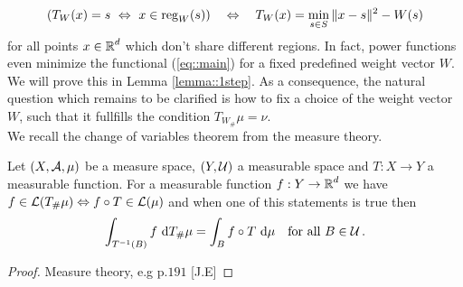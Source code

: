 \documentclass[
     12pt,         %
     a4paper,      %
     BCOR=10mm,     %
     DIV=14,        %
     ]{scrreprt}
\begin{document}
    \begin{align}
        ( T_W(x) = s \  \Leftrightarrow \ x\in \operatorname{reg}_W(s) ) \quad \Leftrightarrow \quad T_W(x) = \min_{s\in S} \|x-s\|^2 - W(s) \label{eq::minimalityPower}
    \end{align}
    for all points $x \in \operatorname{\mathbb{R}}^d$ which don't share different regions. In fact, power functions even minimize the functional (\ref{eq::main}) for a fixed predefined weight vector $W$.
    We will prove this in Lemma \ref{lemma::1step}. As a consequence, the natural question which remains to be clarified is how to fix a choice of the weight vector $W$, such that it fullfills the condition $T_{W_{\#}}\mu = \nu$.\\[8pt]
    \indent We recall the change of variables theorem from the measure theory. 
    \begin{thm*}
         Let $(X, \operatorname{\mathcal{A}}, \mu)$ be a measure space, $(Y, \operatorname{\mathcal{U}})$ a measurable space and $T: X \to Y $ a measurable function.
         For a measurable function $f : Y \to \operatorname{\mathbb{R}}^d $ we have $f\in \operatorname{\mathcal{L}}(T_\#\mu) \Leftrightarrow f \circ T \in \operatorname{\mathcal{L}}(\mu) $ and when one of this statements is true then 
         \begin{align} \label{eq::transformel}
             \int_{T^{-1}(B)} f \ {\operatorname{{\mathrm{d}}}} T_{\#}\mu = \int_{B} f \circ T \ {\operatorname{{\mathrm{d}}}} \mu \quad \text{for all } B\in \operatorname{\mathcal{U}}.
         \end{align}
    \end{thm*}
    \begin{proof}[Proof]
    Measure theory, e.g p.$191$ [J.E]
    \end{proof}
    
\end{document}
